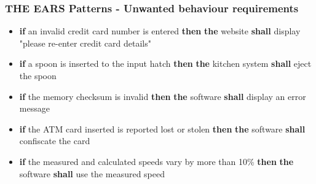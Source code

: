 \documentclass[aspectratio=169]{beamer}
\newcommand{\earsw}[3]{{\bf \color{mygreen}if} {#1} {\bf \color{mygreen}then} {\bf \color{mypurple}the} {#2} {\bf \color{mypurple}shall} {#3}}
\begin{document}
%
\begin{frame}
  \frametitle{THE EARS Patterns - Unwanted behaviour requirements}
  \begin{example}
   \begin{itemize}
    \item \earsw{an invalid credit card number is entered}{website}{display "please re-enter credit card details"}
    \item \earsw{a spoon is inserted to the input hatch}{kitchen system}{eject the spoon}
    \item \earsw{the memory checksum is invalid}{software}{display an error message}
    \item \earsw{the ATM card inserted is reported lost or stolen}{software}{confiscate the card}
    \item \earsw{the measured and calculated speeds vary by more than
10\%}{software}{use the measured speed}
   \end{itemize}
  \end{example}
\end{frame}



%
%
\end{document}

